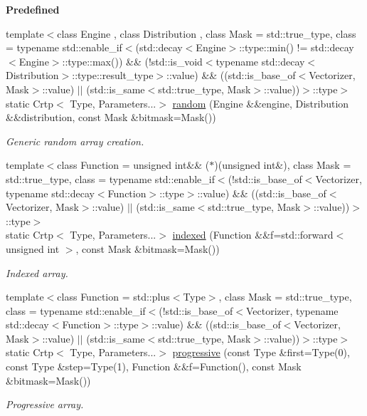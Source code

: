 \begin{Indent}{\bf Predefined}
\begin{DoxyCompactItemize}
{\footnotesize template$<$class Engine , class Distribution , class Mask  = std\-::true\-\_\-type, class  = typename std\-::enable\-\_\-if$<$(std\-::decay$<$\-Engine$>$\-::type\-::min() != std\-::decay$<$\-Engine$>$\-::type\-::max()) \&\& (!std\-::is\-\_\-void$<$typename std\-::decay$<$\-Distribution$>$\-::type\-::result\-\_\-type$>$\-::value) \&\& ((std\-::is\-\_\-base\-\_\-of$<$\-Vectorizer, Mask$>$\-::value) $|$$|$ (std\-::is\-\_\-same$<$std\-::true\-\_\-type, Mask$>$\-::value))$>$\-::type$>$ }\\static Crtp$<$ Type, Parameters...$>$ \hyperlink{classmagrathea_1_1AbstractNArray_a81025fb12cb507c7904844e0c951544a}{random} (Engine \&\&engine, Distribution \&\&distribution, const Mask \&bitmask=Mask())
\begin{DoxyCompactList}\small\item\em Generic random array creation. \end{DoxyCompactList}\item 
{\footnotesize template$<$class Function  = unsigned int\&\& ($\ast$)(unsigned int\&), class Mask  = std\-::true\-\_\-type, class  = typename std\-::enable\-\_\-if$<$(!std\-::is\-\_\-base\-\_\-of$<$\-Vectorizer, typename std\-::decay$<$\-Function$>$\-::type$>$\-::value) \&\& ((std\-::is\-\_\-base\-\_\-of$<$\-Vectorizer, Mask$>$\-::value) $|$$|$ (std\-::is\-\_\-same$<$std\-::true\-\_\-type, Mask$>$\-::value))$>$\-::type$>$ }\\static Crtp$<$ Type, Parameters...$>$ \hyperlink{classmagrathea_1_1AbstractNArray_ae57f7b55dfc54ba036993bf7ba86075a}{indexed} (Function \&\&f=std\-::forward$<$ unsigned int $>$, const Mask \&bitmask=Mask())
\begin{DoxyCompactList}\small\item\em Indexed array. \end{DoxyCompactList}\item 
{\footnotesize template$<$class Function  = std\-::plus$<$\-Type$>$, class Mask  = std\-::true\-\_\-type, class  = typename std\-::enable\-\_\-if$<$(!std\-::is\-\_\-base\-\_\-of$<$\-Vectorizer, typename std\-::decay$<$\-Function$>$\-::type$>$\-::value) \&\& ((std\-::is\-\_\-base\-\_\-of$<$\-Vectorizer, Mask$>$\-::value) $|$$|$ (std\-::is\-\_\-same$<$std\-::true\-\_\-type, Mask$>$\-::value))$>$\-::type$>$ }\\static Crtp$<$ Type, Parameters...$>$ \hyperlink{classmagrathea_1_1AbstractNArray_ade21ec1a302b2a206434b7a80e5b5450}{progressive} (const Type \&first=Type(0), const Type \&step=Type(1), Function \&\&f=Function(), const Mask \&bitmask=Mask())
\begin{DoxyCompactList}\small\item\em Progressive array. \end{DoxyCompactList}\end{DoxyCompactItemize}
\end{Indent}
